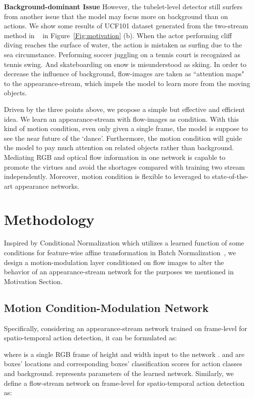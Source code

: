 \documentclass[10pt,twocolumn,letterpaper]{article}
\begin{document}
{\bf{Background-dominant Issue}} However, the tubelet-level detector still surfers from another issue that the model may focus more on background than on actions. We show some results of UCF101 dataset generated from the two-stream method in ~\cite{Singh2017} in Figure~\ref{Fig:motivation} (b). When the actor performing cliff diving reaches the surface of water, the action is mistaken as surfing due to the sea circumstance. Performing soccer juggling on a tennis court is recognized as tennis swing. And skateboarding on snow is misunderstood as skiing. In order to decrease the influence of background, flow-images are taken as ``attention maps" to the appearance-stream, which impels the model to learn more from the moving objects.

Driven by the three points above, we propose a simple but effective and efficient idea. We learn an appearance-stream with flow-images as condition. With this kind of motion condition, even only given a single frame, the model is suppose to see the near future of the `dance'. Furthermore, the motion condition will guide the model to pay much attention on related objects rather than background. Mediating RGB and optical flow information in one network is capable to promote the virtues and avoid the shortages compared with training two stream independently. Moreover, motion condition is flexible to leveraged to state-of-the-art appearance networks.     

\section{Methodology}
Inspired by Conditional Normalization which utilizes a learned function of some conditions for feature-wise affine transformation in Batch Normalization~\cite{Wang2018, Ioffe2015, Perez2017}, we design a motion-modulation layer conditioned on flow images to alter the behavior of an appearance-stream network for the purposes we mentioned in Motivation Section. 

\subsection{Motion Condition-Modulation Network}
Specifically, considering an appearance-stream network  trained on frame-level for spatio-temporal action detection, it can be formulated as:

where  is a single RGB frame of  height and  width input to the network .  and  are  boxes' locations and corresponding boxes' classification scores for  action classes and background.  represents parameters of the learned network. Similarly, we define a flow-stream network on frame-level for spatio-temporal action detection as:
\end{document}
